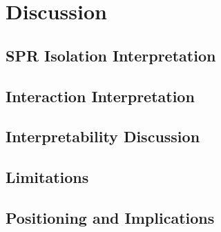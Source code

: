 \chapter{Discussion}
\label{ch:discussion}

\section{SPR Isolation Interpretation}
\label{sec:spr-isolation}

\section{Interaction Interpretation}
\label{sec:interaction-interpretation}

\section{Interpretability Discussion}
\label{sec:interpretability-discussion}

\section{Limitations}
\label{sec:limitations}

\section{Positioning and Implications}
\label{sec:positioning}
